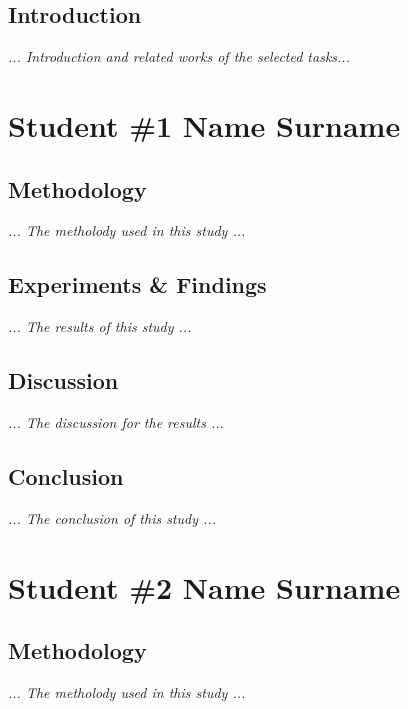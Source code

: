 \documentclass[a4paper,12pt]{report}
\begin{document}
%
%
\maketitle

\makeabstract

\maketableofcontents

\setcounter{page}{1} %

%
%
\section*{Introduction}
\textit{... Introduction and related works of the selected tasks...}
\newpage

\chapter{Student \#1 Name Surname}
\section{Methodology}
\textit{... The metholody used in this study ...}
\newpage

\section{Experiments \& Findings}
\textit{... The results of this study ...}
\newpage

\section{Discussion}
\textit{... The discussion for the results ...}
\newpage

\section{Conclusion}
\textit{... The conclusion of this study ...}

\chapter{Student \#2 Name Surname}
\section{Methodology}
\textit{... The metholody used in this study ...}
\newpage
\end{document}
